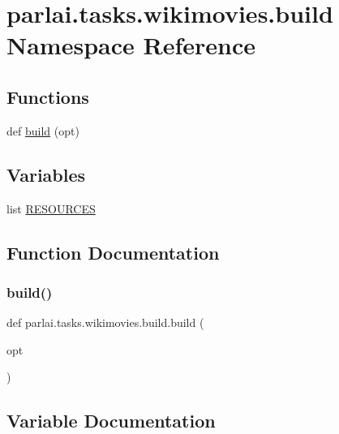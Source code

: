 \hypertarget{namespaceparlai_1_1tasks_1_1wikimovies_1_1build}{}\section{parlai.\+tasks.\+wikimovies.\+build Namespace Reference}
\label{namespaceparlai_1_1tasks_1_1wikimovies_1_1build}
\subsection*{Functions}
\begin{DoxyCompactItemize}
\item 
def \hyperlink{namespaceparlai_1_1tasks_1_1wikimovies_1_1build_ab6770dc56d9b37e12ea2766d235a46e7}{build} (opt)
\end{DoxyCompactItemize}
\subsection*{Variables}
\begin{DoxyCompactItemize}
\item 
list \hyperlink{namespaceparlai_1_1tasks_1_1wikimovies_1_1build_a38f8fa2dc740ef387599450a21082dda}{R\+E\+S\+O\+U\+R\+C\+ES}
\end{DoxyCompactItemize}


\subsection{Function Documentation}
\mbox{\label{namespaceparlai_1_1tasks_1_1wikimovies_1_1build_ab6770dc56d9b37e12ea2766d235a46e7}} 
\subsubsection{\texorpdfstring{build()}{build()}}
{\footnotesize\ttfamily def parlai.\+tasks.\+wikimovies.\+build.\+build (\begin{DoxyParamCaption}\item[{}]{opt }\end{DoxyParamCaption})}



\subsection{Variable Documentation}
\mbox{\label{namespaceparlai_1_1tasks_1_1wikimovies_1_1build_a38f8fa2dc740ef387599450a21082dda}} 
